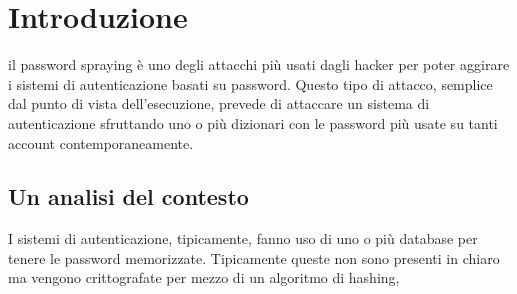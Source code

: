 \section{Introduzione}

il password spraying è uno degli attacchi più usati dagli hacker per poter aggirare i sistemi di autenticazione basati su password. Questo tipo di attacco, semplice dal punto di vista dell'esecuzione, prevede di attaccare un sistema di autenticazione sfruttando uno o più dizionari con le password più usate su tanti account contemporaneamente. 

\subsection{Un analisi del contesto}
I sistemi di autenticazione, tipicamente, fanno uso di uno o più database per tenere le password memorizzate. Tipicamente queste non sono presenti in chiaro ma vengono crittografate per mezzo di un algoritmo di hashing, 
